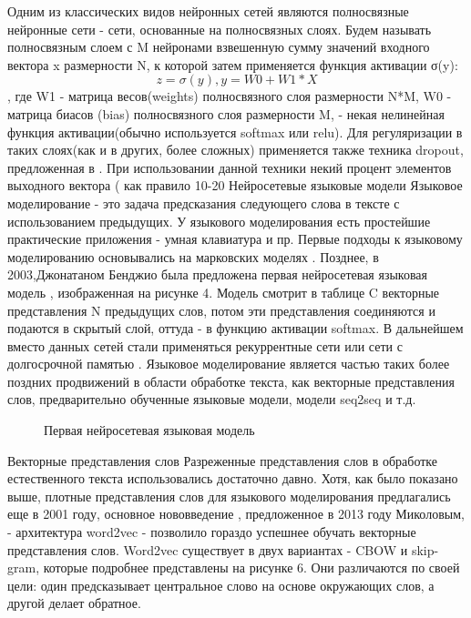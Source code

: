 Одним из классических видов нейронных сетей являются полносвязные нейронные сети - сети, основанные на полносвязных слоях. Будем называть полносвязным слоем с M нейронами взвешенную сумму значений входного вектора x размерности N, к которой затем применяется функция активации σ(y): $$z = σ(y), y = W0+W1*X$$, где W1 - матрица весов(weights) полносвязного слоя размерности N*M, W0 - матрица биасов (bias) полносвязного слоя размерности M, \sigma - некая нелинейная функция активации(обычно используется softmax или relu). Для регуляризации в таких слоях(как и в других, более сложных) применяется также техника dropout, предложенная в \cite{JMLR:v15:srivastava14a}.  При использовании данной техники некий процент элементов выходного вектора ( как правило 10-20%
Нейросетевые языковые модели
Языковое моделирование - это задача предсказания следующего слова в тексте с использованием предыдущих. У языкового моделирования есть простейшие практические приложения - умная клавиатура и пр. Первые подходы к языковому моделированию основывались на марковских моделях\cite{Kneser_Ney_1995} . Позднее, в 2003,Джонатаном Бенджио была предложена первая нейросетевая языковая модель \cite{Bengio_Ducharme_Vincent_Janvin_2003}, изображенная на рисунке 4. 
Модель смотрит в таблице  C векторные представления N предыдущих слов, потом эти представления соединяются и подаются в скрытый слой, оттуда - в функцию активации softmax. В дальнейшем вместо данных сетей стали применяться рекуррентные сети \cite{Mikolov_Karafiát_Burget_Černocký_Khudanpur_2010} или сети с долгосрочной памятью \cite{Hochreiter_Schmidhuber_1997}.
Языковое моделирование является частью таких более поздних продвижений в области обработке текста, как векторные представления слов, предварительно обученные языковые модели, модели seq2seq и т.д.

\begin{figure}[ht]
  \caption{Первая нейросетевая языковая модель}\label{fig:Neuro1-Feedforward}
\end{figure}


Векторные представления слов
Разреженные представления слов в обработке естественного текста использовались достаточно давно. Хотя, как было показано выше, плотные представления слов для языкового моделирования предлагались еще в 2001 году, основное нововведение \cite{Mikolov_Chen_Corrado_Dean_2013}, предложенное в 2013 году Миколовым, - архитектура word2vec - позволило гораздо успешнее обучать векторные представления слов. Word2vec существует в двух вариантах - CBOW и skip-gram, которые подробнее представлены на рисунке 6. Они различаются по своей цели: один предсказывает центральное слово на основе окружающих слов, а другой делает обратное.


